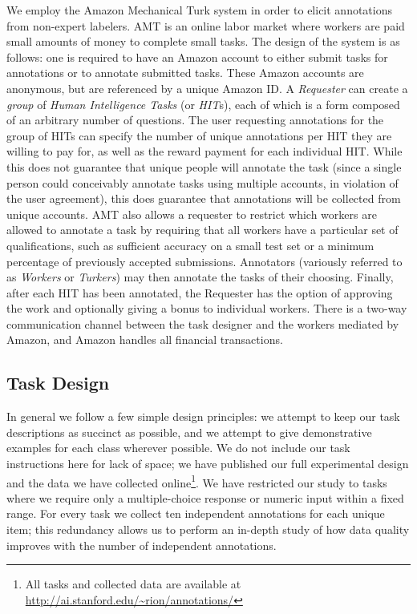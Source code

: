 \documentclass[11pt]{article}
\newcommand{\hurl}[1]{\href{#1}{\scriptsize{\url{#1}}}}
\begin{document}
We employ the Amazon Mechanical Turk system in order to elicit annotations from non-expert labelers.  %
AMT is an online labor market where workers are paid small amounts of money to complete small tasks.  The design of the system is as follows: one is required to have an Amazon account to either submit tasks for annotations or to annotate submitted tasks.  These Amazon accounts are anonymous, but are referenced by a unique Amazon ID.  A \textit{Requester} can create a \textit{group} of \textit{Human Intelligence Tasks} (or \textit{HIT}s), each of which is a form composed of an arbitrary number of questions.  The user requesting annotations for the group of HITs can specify the number of unique annotations per HIT they are willing to pay for, as well as the reward payment for each individual HIT.  While this does not guarantee that unique people will annotate the task (since a single person could conceivably annotate tasks using multiple accounts, in violation of the user agreement), this does guarantee that annotations will be collected from unique accounts.  AMT also allows a requester to restrict which workers are allowed to annotate a task by requiring that all workers have a particular set of qualifications, such as sufficient accuracy on a small test set or a minimum percentage of previously accepted submissions.  Annotators (variously referred to as \textit{Workers} or \textit{Turkers}) may then annotate the tasks of their choosing. Finally, after each HIT has been annotated, the Requester has the option of approving the work and optionally giving a bonus to individual workers. There is a two-way communication channel between the task designer and the workers mediated by Amazon, and Amazon handles all financial transactions.
 
\vspace*{-0.05in}
\subsection{ Task Design }

In general we follow a few simple design principles:  we attempt to keep our task descriptions as succinct as possible, and we attempt to give demonstrative examples for each class wherever possible.  We do not include our task instructions here for lack of space; we have published our full experimental design and the data we have collected online\footnote{All tasks and collected data are available at \hurl{http://ai.stanford.edu/\~rion/annotations/}}.  We have restricted our study to tasks where we require only a multiple-choice response or numeric input within a fixed range. For every task we collect ten independent annotations for each unique item; this redundancy allows us to perform an in-depth study of how data quality improves with the number of independent annotations.
\end{document}
